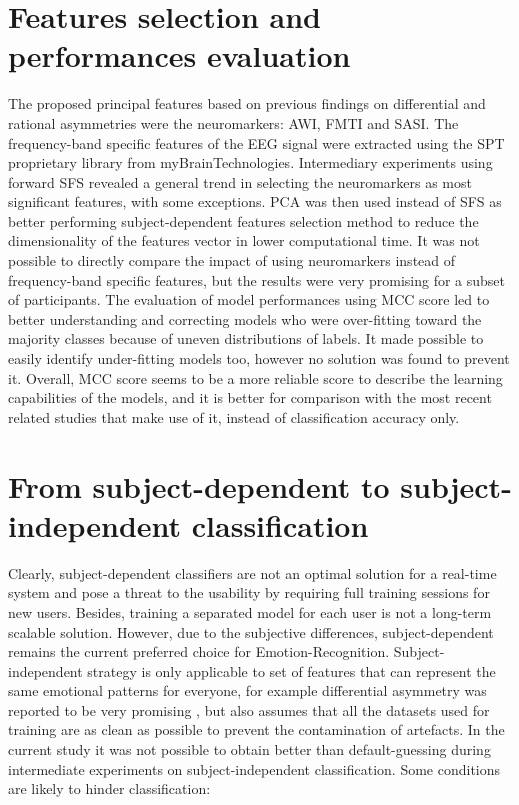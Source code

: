 \section{Features selection and performances evaluation}
\label{sec:features_performances}
The proposed principal features based on previous findings on differential and rational asymmetries were the neuromarkers: \ac{AWI}, \ac{FMTI} and \ac{SASI}. The frequency-band specific features of the \ac{EEG} signal were extracted using the \ac{SPT} proprietary library from myBrainTechnologies. Intermediary experiments using forward \ac{SFS} revealed a general trend in selecting the neuromarkers as most significant features, with some exceptions. \ac{PCA} was then used instead of \ac{SFS} as better performing subject-dependent features selection method to reduce the dimensionality of the features vector in lower computational time. It was not possible to directly compare the impact of using neuromarkers instead of frequency-band specific features, but the results were very promising for a subset of participants. The evaluation of model performances using \ac{MCC} score led to better understanding and correcting models who were over-fitting toward the majority classes because of uneven distributions of labels. It made possible to easily identify under-fitting models too, however no solution was found to prevent it. Overall, \ac{MCC} score seems to be a more reliable score to describe the learning capabilities of the models, and it is better for comparison with the most recent related studies that make use of it, instead of classification accuracy only.

\section{From subject-dependent to subject-independent classification}
\label{sec:sd_to_si}
Clearly, subject-dependent classifiers are not an optimal solution for a real-time system and pose a threat to the usability by requiring full training sessions for new users. Besides, training a separated model for each user is not a long-term scalable solution. However, due to the subjective differences, subject-dependent remains the current preferred choice for Emotion-Recognition. Subject-independent strategy is only applicable to set of features that can represent the same emotional patterns for everyone, for example differential asymmetry was reported to be very promising \cite{lin_toward_2015}, but also assumes that all the datasets used for training are as clean as possible to prevent the contamination of artefacts. In the current study it was not possible to obtain better than default-guessing during intermediate experiments on subject-independent classification. Some conditions are likely to hinder classification:

